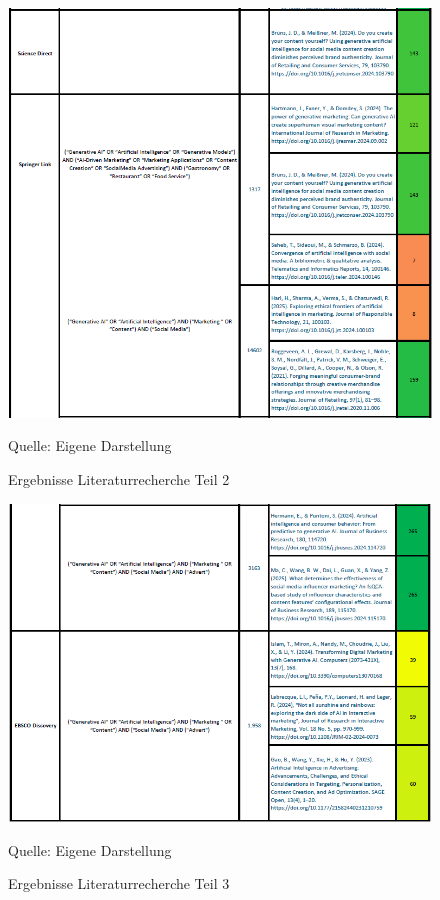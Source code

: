 \begin{figure}[htbp]
    \centering
    \includegraphics[width=\textwidth]{abbildungen/Literaturtabelle_2}
    \caption{Ergebnisse Literaturrecherche Teil 2}
    \label{fig:Literaturtabelle_2}
    \vspace{0.5cm}
    \raggedright Quelle: Eigene Darstellung
\end{figure}

\begin{figure}[htbp]
    \centering
    \includegraphics[width=\textwidth]{abbildungen/Literaturtabelle_3}
    \caption{Ergebnisse Literaturrecherche Teil 3}
    \label{fig:Literaturtabelle_3}
    \vspace{0.5cm}
    \raggedright Quelle: Eigene Darstellung
\end{figure}


